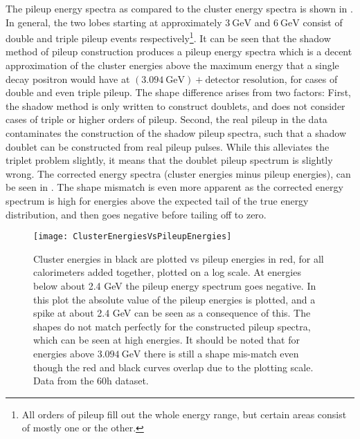 The pileup energy spectra as compared to the cluster energy spectra is shown in . In general, the two lobes starting at approximately $\SI{3}{\GeV}$ and $\SI{6}{\GeV}$ consist of double and triple pileup events respectively\footnote{All orders of pileup fill out the whole energy range, but certain areas consist of mostly one or the other.}. It can be seen that the shadow method of pileup construction produces a pileup energy spectra which is a decent approximation of the cluster energies above the maximum energy that a single decay positron would have at $(\SI{3.094}{\GeV}) + \text{detector resolution}$, for cases of double and even triple pileup. The shape difference arises from two factors: First, the shadow method is only written to construct doublets, and does not consider cases of triple or higher orders of pileup. Second, the real pileup in the data contaminates the construction of the shadow pileup spectra, such that a shadow doublet can be constructed from real pileup pulses. While this alleviates the triplet problem slightly, it means that the doublet pileup spectrum is slightly wrong. The corrected energy spectra (cluster energies minus pileup energies), can be seen in . The shape mismatch is even more apparent as the corrected energy spectrum is high for energies above the expected tail of the true energy distribution, and then goes negative before tailing off to zero. 


    \begin{figure}[]
        \centering
        \texttt{[image: ClusterEnergiesVsPileupEnergies]}
        \caption[Cluster energies vs pileup energies]{Cluster energies in black are plotted vs pileup energies in red, for all calorimeters added together, plotted on a log scale. At energies below about 2.4 GeV the pileup energy spectrum goes negative. In this plot the absolute value of the pileup energies is plotted, and a spike at about 2.4 GeV can be seen as a consequence of this. The shapes do not match perfectly for the constructed pileup spectra, which can be seen at high energies. It should be noted that for energies above $\SI{3.094}{\GeV}$ there is still a shape mis-match even though the red and black curves overlap due to the plotting scale. Data from the 60h dataset.}    
        \label{fig:ClusterEnergiesVsPileupEnergies}
    \end{figure}


